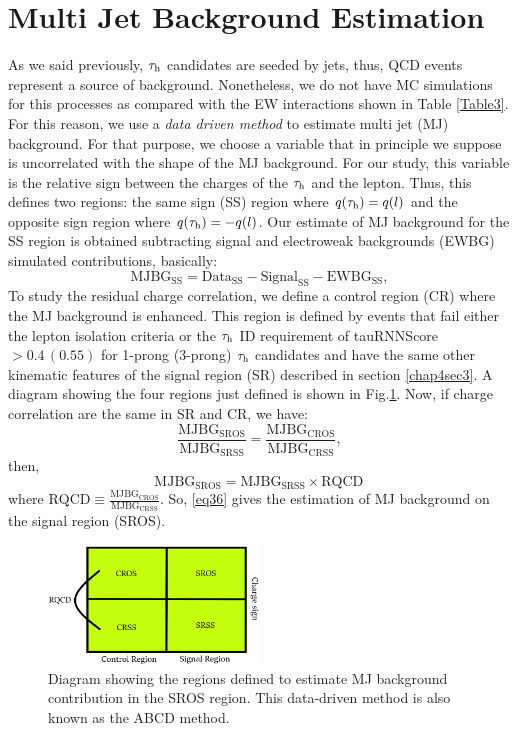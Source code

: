 \section{Multi Jet Background Estimation}
As we said previously, $\tau_\text{h}$ candidates are seeded by jets, thus, QCD events represent a source of background. Nonetheless, we do not have MC simulations for this processes as compared with the EW interactions shown in Table \ref{Table3}. For this reason, we use a \textit{data driven method} to estimate multi jet (MJ) background. For that purpose, we choose a variable that in principle we suppose is uncorrelated with the shape of the MJ background. For our study, this variable is the relative sign between the charges of the $\tau_\text{h}$ and the lepton. Thus, this defines two regions: the same sign (SS) region where $q(\tau_\text{h})=q(l)$ and the opposite sign region where $q(\tau_\text{h})=-q(l)$. Our estimate of MJ background for the SS region is obtained subtracting signal and electroweak backgrounds (EWBG) simulated contributions, basically:
\begin{equation}
\text{MJBG}_{\text{SS}}=\text{Data}_{\text{SS}}-\text{Signal}_{\text{SS}}-\text{EWBG}_{\text{SS}},
\end{equation}
 To study the residual charge correlation, we define a control region (CR) where the MJ background is enhanced. This region is defined by events that fail either the lepton isolation criteria or the $\tau_\text{h}$ ID requirement of tauRNNScore$>0.4\, (0.55)$ for 1-prong (3-prong) $\tau_\text{h}$ candidates and have the same other kinematic features of the signal region (SR) described in section \ref{chap4sec3}. A diagram showing the four regions just defined is shown in Fig.\ref{Fig13}. Now, if charge correlation are the same in SR and CR, we have:
 \begin{equation}
 \frac{\text{MJBG}_{\text{SROS}}}{\text{MJBG}_{\text{SRSS}}}=\frac{\text{MJBG}_{\text{CROS}}}{\text{MJBG}_{\text{CRSS}}},
 \end{equation}
then,
 \begin{equation}
\text{MJBG}_{\text{SROS}}=\text{MJBG}_{\text{SRSS}}\times \text{RQCD}\,
\label{eq36}
\end{equation}
where $\text{RQCD}\equiv\frac{\text{MJBG}_{\text{CROS}}}{\text{MJBG}_{\text{CRSS}}}$. So, \eqref{eq36} gives the estimation of MJ background on the signal region (SROS).
\begin{figure}[H]
	\centering
	\includegraphics[width=0.5\textwidth]{figures/Fig13}
	\caption{Diagram showing the regions defined to estimate MJ background contribution in the SROS region. This data-driven method is also known as the ABCD method.}
	\label{Fig13}
\end{figure}
